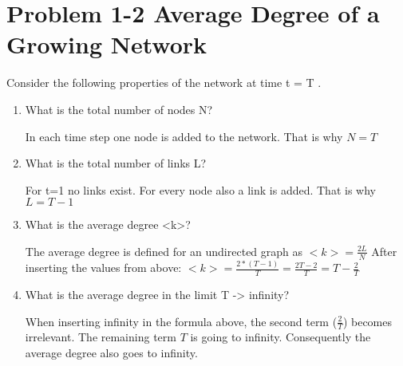 \section{Problem 1-2 Average Degree of a Growing Network}


Consider the following properties of the network at time t = T .

\begin{enumerate}
	\item What is the total number of nodes N?
	
	In each time step one node is added to the network. That is why $N = T$
	
	\item What is the total number of links L?
	
	For t=1 no links exist. For every node also a link is added. That is why $L = T - 1$
	
	\item What is the average degree <k>?
	
	The average degree is defined for an undirected graph as $<k> = \frac{2L}{N} $
	After inserting the values from above: $<k> = \frac{2*(T-1)}{T} = \frac{2T-2}{T} = T - \frac{2}{T} $
	
	\item What is the average degree in the limit T -> infinity?
	
	When inserting infinity in the formula above, the second term ($\frac{2}{T}$) becomes irrelevant. The remaining term $T$ is going to infinity. Consequently the average degree also goes to infinity.
	
\end{enumerate}